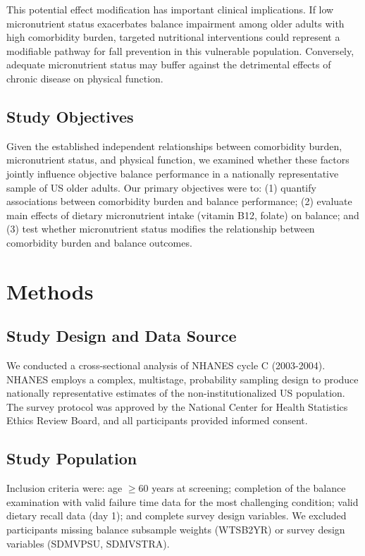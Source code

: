 \documentclass[11pt,a4paper]{article}
\begin{document}
This potential effect modification has important clinical implications. If low micronutrient status exacerbates balance impairment among older adults with high comorbidity burden, targeted nutritional interventions could represent a modifiable pathway for fall prevention in this vulnerable population. Conversely, adequate micronutrient status may buffer against the detrimental effects of chronic disease on physical function.

\subsection{Study Objectives}

Given the established independent relationships between comorbidity burden, micronutrient status, and physical function, we examined whether these factors jointly influence objective balance performance in a nationally representative sample of US older adults. Our primary objectives were to: (1) quantify associations between comorbidity burden and balance performance; (2) evaluate main effects of dietary micronutrient intake (vitamin B12, folate) on balance; and (3) test whether micronutrient status modifies the relationship between comorbidity burden and balance outcomes.

\section{Methods}

\subsection{Study Design and Data Source}

We conducted a cross-sectional analysis of NHANES cycle C (2003-2004). NHANES employs a complex, multistage, probability sampling design to produce nationally representative estimates of the non-institutionalized US population. The survey protocol was approved by the National Center for Health Statistics Ethics Review Board, and all participants provided informed consent.

\subsection{Study Population}

Inclusion criteria were: age $\geq$60 years at screening; completion of the balance examination with valid failure time data for the most challenging condition; valid dietary recall data (day 1); and complete survey design variables. We excluded participants missing balance subsample weights (WTSB2YR) or survey design variables (SDMVPSU, SDMVSTRA).
\end{document}
